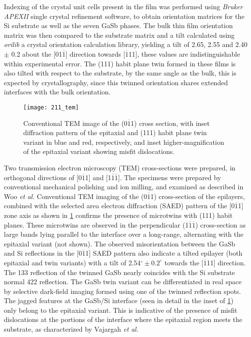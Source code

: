 Indexing of the crystal unit cells present in the film was performed using \textit{Bruker APEXII} single crystal refinement software, to obtain orientation matrices for the Si substrate as well as the seven GaSb phases.
The bulk thin film orientation matrix was then compared to the substrate matrix and a tilt calculated using \textit{orilib} a crystal orientation calculation library, yielding a tilt of 2.65\degree{}, 2.55\degree{} and 2.40\degree{} \(\pm\) 0.2\degree{} about the [01\(\overline{1}\)] direction towards [\(\overline{1}\)11], these values are indistinguishable within experimental error.
The (111) habit plane twin formed in these films is also tilted with respect to the substrate, by the same angle as the bulk, this is expected by crystallography, since this twinned orientation shares extended interfaces with the bulk orientation.
\begin{figure}
 \centering \texttt{[image: 211\_tem]}
 \caption[TEM of thin film on 211 silicon]{\label{fig:211_tem}Conventional TEM image of the (0\(\overline{1}\)1) cross section, with inset diffraction pattern of the epitaxial and (111) habit plane twin variant in blue and red, respectively, and inset higher-magnification of the epitaxial variant showing misfit dislocations.}
\end{figure}

Two transmission electron microscopy (TEM) cross-sections were prepared, in orthogonal directions of [0\(\overline{1}\)1] and
[1\(\overline{1}\overline{1}\)].
The specimens were prepared by conventional mechanical polishing and ion milling, and examined as described in Woo \textit{et al.}\cite{Woo2012} Conventional TEM imaging of the (0\(\overline{1}\)1) cross-section of the epilayers, combined with the selected area electron diffraction (SAED) pattern of the [0\(\overline{1}\)1] zone axis as shown in \cref{fig:211_tem} confirms the presence of microtwins with (111) habit planes.
These microtwins are observed in the perpendicular
(1\(\overline{1}\overline{1}\))
cross-section as large bands lying parallel to the interface over a long-range, alternating with the epitaxial variant (not shown).
The observed misorientation between the GaSb and Si reflections in the [0\(\overline{1}\)1] SAED pattern also indicate a tilted epilayer (both epitaxial and twin variants) with a tilt of 2.54\(^\circ \pm 0.2^\circ\)
towards the [\(\overline{1}\)11] direction.
The 133 reflection of the twinned GaSb nearly coincides with the Si substrate normal 422 reflection.
The GaSb twin variant can be differentiated in real space by selective dark-field imaging formed using one of the twinned reflection spots.
The jagged features at the GaSb/Si interface (seen in detail in the inset of \cref{fig:211_tem}) only belong to the epitaxial variant.
This is indicative of the presence of misfit dislocations at the portions of the interface where the epitaxial region meets the substrate, as characterized by Vajargah \textit{et al.}\cite{Vajargah2011b}
